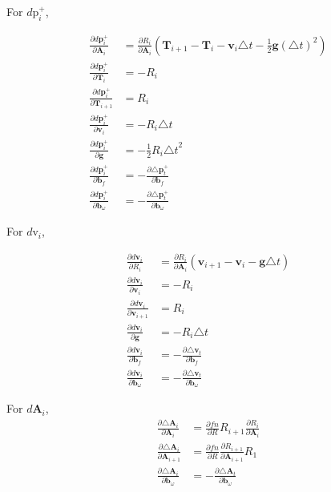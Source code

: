 \documentclass[12pt]{article}   %
\begin{document}
For $d\text{p}^+_{i}$,

\begin{align}
\frac{\partial d\textbf{p}^+_{i}}{\partial \textbf{A}_{i}} &= \frac{\partial R_i}{\partial \textbf{A}_i} (\textbf{T}_{i+1} - \textbf{T}_i - \textbf{v}_i \triangle t - \frac{1}{2} \textbf{g} {(\triangle t)}^2) \\
\frac{\partial d\textbf{p}^+_{i}}{\partial \textbf{T}_{i}} &= -R_i \\
\frac{\partial d\textbf{p}^+_{i}}{\partial \textbf{T}_{i+1}} &= R_i \\
\frac{\partial d\textbf{p}^+_{i}}{\partial \textbf{v}_{i}} &= -R_i \triangle t \\
\frac{\partial d\textbf{p}^+_{i}}{\partial \textbf{g}} &= -\frac{1}{2} R_i {\triangle t}^2 \\
\frac{\partial d\textbf{p}^+_{i}}{\partial \textbf{b}_f} &= - \frac{\partial \triangle \textbf{p}^+_t}{\partial \textbf{b}_f}\\
\frac{\partial d\textbf{p}^+_{i}}{\partial \textbf{b}_\omega} &= - \frac{\partial \triangle \textbf{p}^+_t}{\partial \textbf{b}_\omega}
\end{align}

For $d\text{v}_{i}$,

\begin{align}
\frac{\partial d\textbf{v}_{i}}{\partial R_{i}} &= \frac{\partial R_i}{\partial \textbf{A}_i} (\textbf{v}_{i+1} - \textbf{v}_i - \textbf{g} \triangle t) \\
\frac{\partial d\textbf{v}_{i}}{\partial \textbf{v}_{i}} &= -R_i \\
\frac{\partial d\textbf{v}_{i}}{\partial \textbf{v}_{i+1}} &= R_i \\
\frac{\partial d\textbf{v}_{i}}{\partial \textbf{g}} &= -R_i \triangle t \\
\frac{\partial d\textbf{v}_{i}}{\partial \textbf{b}_f} &= - \frac{\partial \triangle \textbf{v}_t}{\partial \textbf{b}_f}\\
\frac{\partial d\textbf{v}_{i}}{\partial \textbf{b}_\omega} &= - \frac{\partial \triangle \textbf{v}_t}{\partial \textbf{b}_\omega}
\end{align}

For $d\textbf{A}_{i}$,
\begin{align}
\frac{\partial \triangle \textbf{A}_{i}}{\partial \textbf{A}_{i}} &= \frac{\partial fn}{\partial R} R_{i+1} \frac{\partial R_i}{\partial \textbf{A}_{i}}\\
\frac{\partial \triangle \textbf{A}_{i}}{\partial \textbf{A}_{i+1}} &= \frac{\partial fn}{\partial R} \frac{\partial R_{i+1}}{\partial \textbf{A}_{i+1}} R_{1} \\
\frac{\partial \triangle \textbf{A}_{i}}{\partial \textbf{b}_\omega} &= - \frac{\partial \triangle \textbf{A}_t}{\partial \textbf{b}_\omega}
\end{align}
\end{document}
